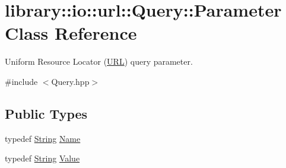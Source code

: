 \hypertarget{classlibrary_1_1io_1_1url_1_1_query_1_1_parameter}{}\section{library\+:\+:io\+:\+:url\+:\+:Query\+:\+:Parameter Class Reference}
\label{classlibrary_1_1io_1_1url_1_1_query_1_1_parameter}


Uniform Resource Locator (\hyperlink{classlibrary_1_1io_1_1_u_r_l}{U\+RL}) query parameter.  




{\ttfamily \#include $<$Query.\+hpp$>$}

\subsection*{Public Types}
\begin{DoxyCompactItemize}
\item 
typedef \hyperlink{namespacelibrary_1_1io_a7469b45835a4421045db344d6a5a1f85}{String} \hyperlink{classlibrary_1_1io_1_1url_1_1_query_1_1_parameter_a7edf5fb8a4ae57aed1ce5dfa2405c981}{Name}
\item 
typedef \hyperlink{namespacelibrary_1_1io_a7469b45835a4421045db344d6a5a1f85}{String} \hyperlink{classlibrary_1_1io_1_1url_1_1_query_1_1_parameter_a46e7a7b97d44f51f83d6261f70ba0a5e}{Value}
\end{DoxyCompactItemize}
